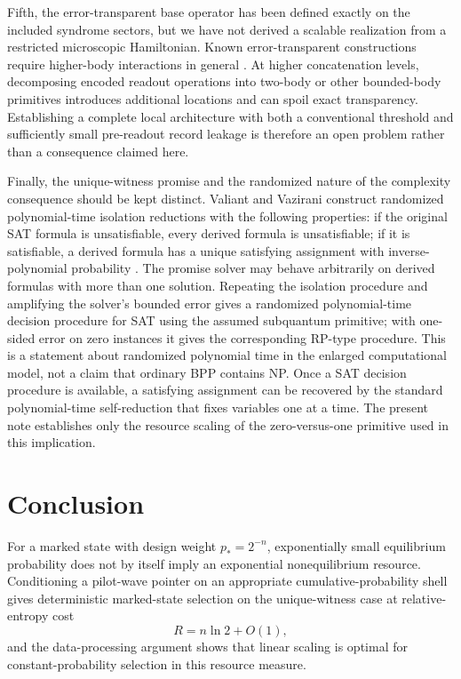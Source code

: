 \documentclass[pdflatex,sn-mathphys-num]{sn-jnl}
\theoremstyle{thmstyleone}
\begin{document}
Fifth, the error-transparent base operator has been defined exactly on the included syndrome sectors, but we have not derived a scalable realization from a restricted microscopic Hamiltonian. Known error-transparent constructions require higher-body interactions in general \cite{VyWangJacobs2013}. At higher concatenation levels, decomposing encoded readout operations into two-body or other bounded-body primitives introduces additional locations and can spoil exact transparency. Establishing a complete local architecture with both a conventional threshold and sufficiently small pre-readout record leakage is therefore an open problem rather than a consequence claimed here.

Finally, the unique-witness promise and the randomized nature of the complexity consequence should be kept distinct. Valiant and Vazirani construct randomized polynomial-time isolation reductions with the following properties: if the original SAT formula is unsatisfiable, every derived formula is unsatisfiable; if it is satisfiable, a derived formula has a unique satisfying assignment with inverse-polynomial probability \cite{ValiantVazirani1986}. The promise solver may behave arbitrarily on derived formulas with more than one solution. Repeating the isolation procedure and amplifying the solver's bounded error gives a randomized polynomial-time decision procedure for SAT using the assumed subquantum primitive; with one-sided error on zero instances it gives the corresponding RP-type procedure. This is a statement about randomized polynomial time in the enlarged computational model, not a claim that ordinary BPP contains NP. Once a SAT decision procedure is available, a satisfying assignment can be recovered by the standard polynomial-time self-reduction that fixes variables one at a time. The present note establishes only the resource scaling of the zero-versus-one primitive used in this implication.

\section{Conclusion}

For a marked state with design weight $p_*=2^{-n}$, exponentially small equilibrium probability does not by itself imply an exponential nonequilibrium resource. Conditioning a pilot-wave pointer on an appropriate cumulative-probability shell gives deterministic marked-state selection on the unique-witness case at relative-entropy cost
\begin{equation}
R=n\ln2+O(1),
\end{equation}
and the data-processing argument shows that linear scaling is optimal for constant-probability selection in this resource measure.
\end{document}
